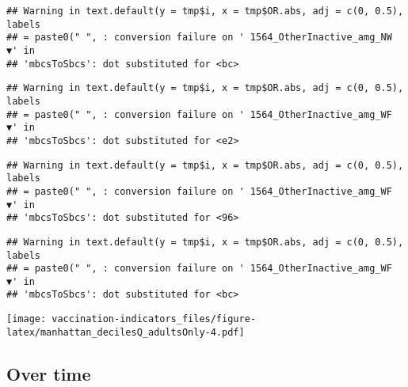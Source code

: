 \documentclass[
]{article}
\begin{document}
\begin{verbatim}
## Warning in text.default(y = tmp$i, x = tmp$OR.abs, adj = c(0, 0.5), labels
## = paste0(" ", : conversion failure on ' 1564_OtherInactive_amg_NW ▼' in
## 'mbcsToSbcs': dot substituted for <bc>
\end{verbatim}

\begin{verbatim}
## Warning in text.default(y = tmp$i, x = tmp$OR.abs, adj = c(0, 0.5), labels
## = paste0(" ", : conversion failure on ' 1564_OtherInactive_amg_WF ▼' in
## 'mbcsToSbcs': dot substituted for <e2>
\end{verbatim}

\begin{verbatim}
## Warning in text.default(y = tmp$i, x = tmp$OR.abs, adj = c(0, 0.5), labels
## = paste0(" ", : conversion failure on ' 1564_OtherInactive_amg_WF ▼' in
## 'mbcsToSbcs': dot substituted for <96>
\end{verbatim}

\begin{verbatim}
## Warning in text.default(y = tmp$i, x = tmp$OR.abs, adj = c(0, 0.5), labels
## = paste0(" ", : conversion failure on ' 1564_OtherInactive_amg_WF ▼' in
## 'mbcsToSbcs': dot substituted for <bc>
\end{verbatim}

\texttt{[image: vaccination-indicators\_files/figure-latex/manhattan\_decilesQ\_adultsOnly-4.pdf]}

\hypertarget{over-time}{%
\subsection{Over time}\label{over-time}}
\end{document}
